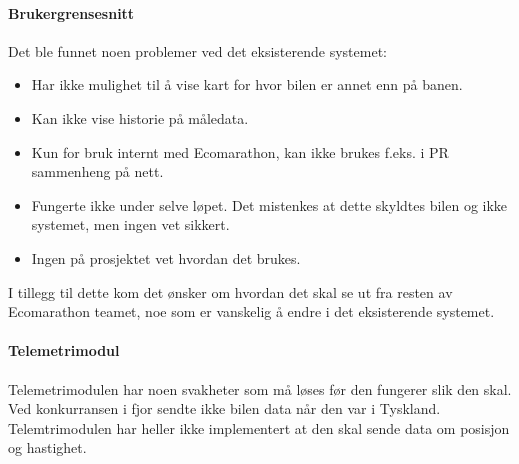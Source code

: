 \paragraph{Brukergrensesnitt}
Det ble funnet noen problemer ved det eksisterende systemet:
\begin{itemize}
\item Har ikke mulighet til å vise kart for hvor bilen er annet enn på banen.
\item Kan ikke vise historie på måledata.
\item Kun for bruk internt med Ecomarathon, kan ikke brukes f.eks. i PR sammenheng på nett.
\item Fungerte ikke under selve løpet. Det mistenkes at dette skyldtes bilen og ikke systemet, men ingen vet sikkert.
\item Ingen på prosjektet vet hvordan det brukes.
\end{itemize}
I tillegg til dette kom det ønsker om hvordan det skal se ut fra resten av Ecomarathon teamet, noe som er vanskelig å endre i det eksisterende systemet.

\paragraph{Telemetrimodul}
Telemetrimodulen har noen svakheter som må løses før den fungerer slik den skal.
Ved konkurransen i fjor sendte ikke bilen data når den var i Tyskland.
Telemtrimodulen har heller ikke implementert at den skal sende data om posisjon og hastighet.
